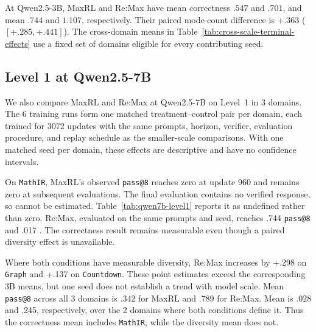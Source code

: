 At Qwen2.5-3B, MaxRL and Re:Max have mean correctness $.547$ and $.701$,
and mean \distk{} $.744$ and $1.107$, respectively. Their paired mode-count
difference is $+.363$ ($[+.285,+.441]$). The cross-domain \pmd{} means in
Table~\ref{tab:cross-scale-terminal-effects} use a fixed set of domains
eligible for every contributing seed.

\subsection{Level 1 at Qwen2.5-7B}
\label{app:qwen7b-level1}

We also compare MaxRL and Re:Max at Qwen2.5-7B on Level~1 in
3 domains. The 6 training runs form one
matched treatment--control pair per domain, each trained for
3072 updates with the same prompts, horizon, verifier,
evaluation procedure, and replay schedule as the smaller-scale comparisons.
With one matched seed per domain, these effects are descriptive and have no
confidence intervals.

On \texttt{MathIR}, MaxRL's observed \texttt{pass@8} reaches zero
at update 960 and remains zero at subsequent evaluations.
The final evaluation contains no verified response, so \pmd{} cannot be
estimated. Table~\ref{tab:qwen7b-level1} reports it as undefined rather than
zero. Re:Max, evaluated on the same prompts and seed, reaches
.744 \texttt{pass@8} and .017
\pmd{}. The correctness result remains measurable even though a paired
diversity effect is unavailable.

Where both conditions have measurable diversity, Re:Max increases \pmd{}
by +.298 on \texttt{Graph} and
+.137 on \texttt{Countdown}. These point estimates
exceed the corresponding 3B means, but one seed does not establish a trend
with model scale. Mean \texttt{pass@8} across all 3 domains
is .342 for MaxRL and .789 for Re:Max. Mean
\pmd{} is .028 and .245, respectively, over the
2 domains where both conditions define it. Thus the
correctness mean includes \texttt{MathIR}, while the diversity
mean does not.

